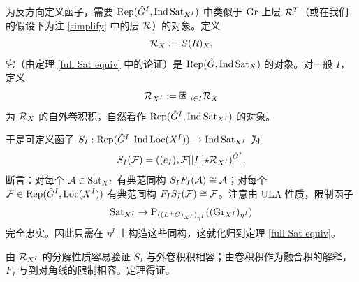 为反方向定义函子，需要 $\operatorname{Rep}(\hat G^I, {\operatorname{Ind}{\operatorname{Sat}}_{X^I}})$ 中类似于 ${\operatorname{Gr}}$ 上层 ${\mathcal R}^T$（或在我们的假设下为注 \ref{simplify} 中的层 ${\mathcal R}$）的对象。定义
\[{\mathcal R}_X:= S(R)_X,\]
它（由定理 \ref{full Sat equiv} 中的论证）是 $\operatorname{Rep}(\hat G, {\operatorname{Ind}{\operatorname{Sat}}_X})$ 的对象。对一般 $I$，定义
\[\mR_{X^I}:=\boxstar_{i\in I} \mR_X\]
为 ${\mathcal R}_X$ 的自外卷积积，自然看作 $\operatorname{Rep}(\hat G^I,{\operatorname{Ind}{\operatorname{Sat}}_{X^I}})$ 的对象。

于是可定义函子 $S_{I}: \operatorname{Rep}(\hat G^I,{\operatorname{Ind}\operatorname{Loc}(X^I)})\to \operatorname{Ind}{\operatorname{Sat}}_{X^I}$ 为
\[S_{I}({\mathcal F})= ((e_I)_*{\mathcal F}[|I|]\text{$\star$}{\mathcal R}_{X^I})^{\hat G^I}.\]
断言：对每个 ${\mathcal A}\in{\operatorname{Sat}}_{X^I}$ 有典范同构 $S_IF_I({\mathcal A})\cong {\mathcal A}$；对每个 ${\mathcal F}\in \operatorname{Rep}(\hat G^I, {\operatorname{Loc}(X^I)})$ 有典范同构 $F_IS_I({\mathcal F})\cong {\mathcal F}$。注意由 ULA 性质，限制函子
\[{\operatorname{Sat}}_{X^I}\to \operatorname{P}_{((L^+G)_{X^I})_{\eta^I}}(({\operatorname{Gr}}_{X^I})_{\eta^I})\]
完全忠实。因此只需在 $\eta^I$ 上构造这些同构，这就化归到定理 \ref{full Sat equiv}。

由 ${\mathcal R}_{X^I}$ 的分解性质容易验证 $S_I$ 与外卷积积相容；由卷积积作为融合积的解释，$F_I$ 与到对角线的限制相容。定理得证。
